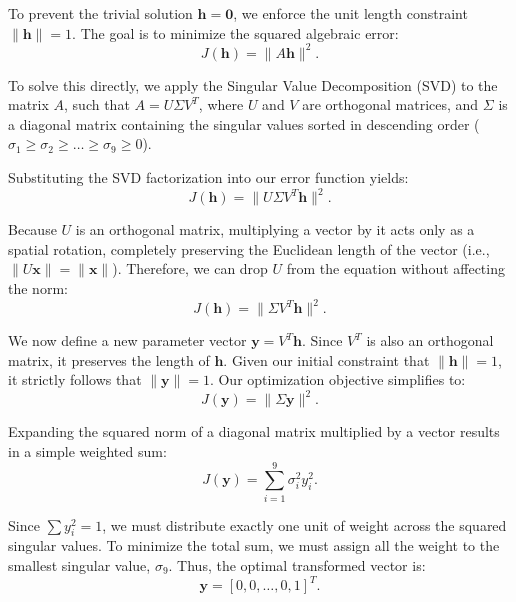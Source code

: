 To prevent the trivial solution $\mathbf{h} = \mathbf{0}$, we enforce the unit length constraint $\|\mathbf{h}\| = 1$. The goal is to minimize the squared algebraic error:
\begin{equation}
J(\mathbf{h}) = \|A\mathbf{h}\|^2.
\end{equation}

To solve this directly, we apply the Singular Value Decomposition (SVD) to the matrix $A$, such that $A = U\Sigma V^T$, where $U$ and $V$ are orthogonal matrices, and $\Sigma$ is a diagonal matrix containing the singular values sorted in descending order ($\sigma_1 \ge \sigma_2 \ge \dots \ge \sigma_9 \ge 0$). 

Substituting the SVD factorization into our error function yields:
\begin{equation}
J(\mathbf{h}) = \|U\Sigma V^T \mathbf{h}\|^2.
\end{equation}

Because $U$ is an orthogonal matrix, multiplying a vector by it acts only as a spatial rotation, completely preserving the Euclidean length of the vector (i.e., $\|U\mathbf{x}\| = \|\mathbf{x}\|$). Therefore, we can drop $U$ from the equation without affecting the norm:
\begin{equation}
J(\mathbf{h}) = \|\Sigma V^T \mathbf{h}\|^2.
\end{equation}

We now define a new parameter vector $\mathbf{y} = V^T \mathbf{h}$. Since $V^T$ is also an orthogonal matrix, it preserves the length of $\mathbf{h}$. Given our initial constraint that $\|\mathbf{h}\| = 1$, it strictly follows that $\|\mathbf{y}\| = 1$. Our optimization objective simplifies to:
\begin{equation}
J(\mathbf{y}) = \|\Sigma \mathbf{y}\|^2.
\end{equation}

Expanding the squared norm of a diagonal matrix multiplied by a vector results in a simple weighted sum:
\begin{equation}
J(\mathbf{y}) = \sum_{i=1}^{9} \sigma_i^2 y_i^2.
\end{equation}

Since $\sum y_i^2 = 1$, we must distribute exactly one unit of weight across the squared singular values. To minimize the total sum, we must assign all the weight to the smallest singular value, $\sigma_9$. Thus, the optimal transformed vector is:
\begin{equation}
\mathbf{y} = [0, 0, \dots, 0, 1]^T.
\end{equation}

